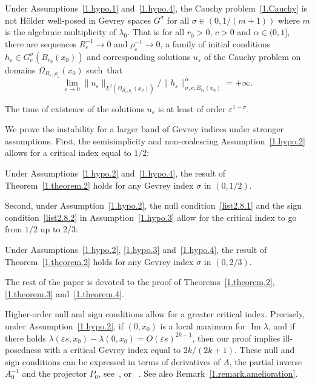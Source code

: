 \documentclass[AHL,Unicode,longabstracts,published]{cedram}
\theoremstyle{plain}
\newcommand*\e{\varepsilon}
\newcommand{\alf}{\alpha}%
\newcommand*\und{\underline}
\DeclareMathOperator{\Imm}{Im}
\begin{document}
\begin{theo}\label{1.theorem.2}
Under Assumptions~\ref{1.hypo.1} and~\ref{1.hypo.4}, the Cauchy problem~\eqref{1.Cauchy} is not H\"older well-posed in Gevrey spaces $G^{\sigma}$ for all $\sigma \in(0,1/(m+1))$ where $m$ is the algebraic multiplicity of $\lambda_0$. That is for all $r_0>0$, $c>0$ and $\alf\in(0,1]$, there are sequences $R_{\e}^{-1} \to 0$ and $\rho_{\e}^{-1} \to 0$, a family of initial conditions $h_{\e}\in G_{c}^{\sigma}\left(B_{r_0}(x_0)\right)$ and corresponding solutions $u_{\e}$ of the Cauchy problem on domains $\Omega_{R_{\e},\rho_{\e}}(x_0)$ such~that
\begin{equation}
\lim_{\e\to 0} \|u_{\e}\|_{L^2(\Omega_{R_{\e},\rho_{\e}}(x_0))} / \|h_{\e}\|_{\sigma,c,B_{r_0}(x_0)}^{\alf} = +\infty.
\end{equation}


The time of existence of the solutions $u_{\e}$ is at least of order $\e^{1-\sigma} $.
\end{theo}

We prove the instability for a larger band of Gevrey indices under stronger assumptions. First, the semisimplicity and non-coalescing Assumption~\ref{1.hypo.2} allows for a critical index equal to $1/2$:

\begin{theo}\label{1.theorem.3}
Under Assumptions~\ref{1.hypo.2} and~\ref{1.hypo.4}, the result of Theorem~\ref{1.theorem.2} holds for any Gevrey index $\sigma$ in $(0,1/2)$.
\end{theo}

Second, under Assumption~\ref{1.hypo.2}, the null condition~\eqref{list2.8.1} and the sign condition~\eqref{list2.8.2} in Assumption~\ref{1.hypo.3} allow for the critical index to go from $1/2$ up to $2/3$:

\begin{theo}\label{1.theorem.4}
Under Assumptions~\ref{1.hypo.2}, \ref{1.hypo.3} and~\ref{1.hypo.4}, the result of Theorem~\ref{1.theorem.2} holds for any Gevrey index $\sigma$ in $(0,2/3)$.
\end{theo}

The rest of the paper is devoted to the proof of Theorems~\ref{1.theorem.2}, \ref{1.theorem.3} and~\ref{1.theorem.4}.

\begin{rema}\label{1.remark.aprestheo3}

Higher-order null and sign conditions allow for a greater critical index. Precisely, under Assumption~\ref{1.hypo.2}, if $(0,x_0)$ is a local maximum for $ {\Imm}\lambda $, and if there holds $ \lambda(\e s,x_0) - \lambda(0,x_0) = O(\e s)^{2k-1} $, then our proof implies ill-posedness with a critical Gevrey index equal to $2k/(2k+1)$. These null and sign conditions can be expressed in terms of derivatives of $\und{A}$, the partial inverse $A_0^{-1}$ and the projector $P_0$, see~\cite{kato2013perturbation}, or ~\cite[Remark~2.7]{texier2004short}. See also Remark~\ref{1.remark.amelioration}.
\end{rema}
\end{document}
